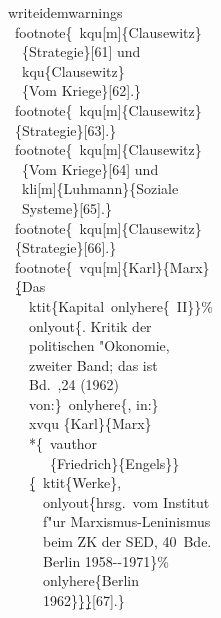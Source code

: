 \documentclass[12pt,a4paper]{article}
\newcommand{\pbs}{\string\ \unskip}
\newcommand{\bs}{\protect\pbs}
\begin{document}
\vspace{.5ex}
\Doppelbox
{\vspace{1ex}
 \bs writeidemwarnings
 \\[.25ex] \ \bs footnote\{\bs kqu[m]\{Clausewitz\} 
 \\ \ \ \ \{Strategie\}[61] und 
 \\ \ \ \bs kqu\{Clausewitz\}
 \\ \ \ \ \{Vom Kriege\}[62].\} 
 \\[1ex] \ \bs footnote\{\bs kqu[m]\{Clausewitz\} 
 \\ \ \ \{Strategie\}[63].\}
 \\[1ex] \ \bs footnote\{\bs kqu[m]\{Clausewitz\} 
 \\ \ \ \ \{Vom Kriege\}[64] und 
 \\ \ \ \bs kli[m]\{Luhmann\}\{Soziale 
 \\ \ \ \ Systeme\}[65].\}
 \\[1ex] \ \bs footnote\{\bs kqu[m]\{Clausewitz\} 
 \\ \ \ \{Strategie\}[66].\}
 \\[1ex] \ \bs footnote\{\bs vqu[m]\{Karl\}\{Marx\} 
 \\ \ \ \b{\b{\{}}Das 
 \\ \ \ \ \bs ktit\{Kapital\bs onlyhere\{\string~II\}\}\%
 \\ \ \ \ \bs onlyout\{. Kritik der 
 \\ \ \ \ \ politischen "Okonomie, 
 \\ \ \ \ \ zweiter Band; das ist 
 \\ \ \ \ \ Bd.\bs,24 (1962) 
 \\ \ \ \ \ von:\}\bs onlyhere\{, in:\} 
 \\ \ \ \ \bs xvqu \{Karl\}\{Marx\}
 \\ \ \ \ \ *\{\bs vauthor
 \\ \ \ \ \ \ \ \ \{Friedrich\}\{Engels\}\} 
 \\ \ \ \ \ \b{\{}\bs ktit\{Werke\}, 
 \\ \ \ \ \ \ \bs onlyout\{hrsg.\ vom Institut 
 \\ \ \ \ \ \ \ f"ur Marxismus-Leninismus 
 \\ \ \ \ \ \ \ beim ZK der SED, 40\string~Bde. 
 \\ \ \ \ \ \ \ Berlin 1958-{}-1971\}\%
 \\ \ \ \ \ \ \bs onlyhere\{Berlin 
 \\ \ \ \ \ \ \ 1962\}\b{\}}\b{\b{\}}}[67].\}
}
\end{document}
